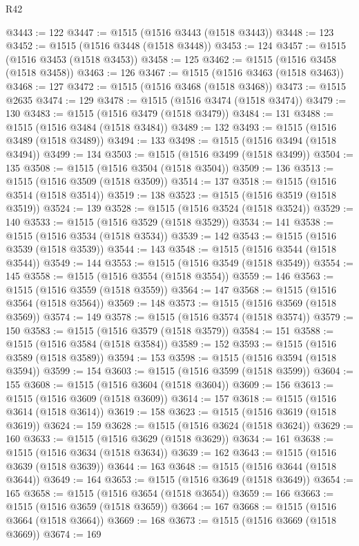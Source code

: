 \begin{lexlean}{R42}
\begin{coremodule}
{@3443 := 122
@3447 := @1515 (@1516 @3443 (@1518 @3443))
@3448 := 123
@3452 := @1515 (@1516 @3448 (@1518 @3448))
@3453 := 124
@3457 := @1515 (@1516 @3453 (@1518 @3453))
@3458 := 125
@3462 := @1515 (@1516 @3458 (@1518 @3458))
@3463 := 126
@3467 := @1515 (@1516 @3463 (@1518 @3463))
@3468 := 127
@3472 := @1515 (@1516 @3468 (@1518 @3468))
@3473 := @1515 @2635
@3474 := 129
@3478 := @1515 (@1516 @3474 (@1518 @3474))
@3479 := 130
@3483 := @1515 (@1516 @3479 (@1518 @3479))
@3484 := 131
@3488 := @1515 (@1516 @3484 (@1518 @3484))
@3489 := 132
@3493 := @1515 (@1516 @3489 (@1518 @3489))
@3494 := 133
@3498 := @1515 (@1516 @3494 (@1518 @3494))
@3499 := 134
@3503 := @1515 (@1516 @3499 (@1518 @3499))
@3504 := 135
@3508 := @1515 (@1516 @3504 (@1518 @3504))
@3509 := 136
@3513 := @1515 (@1516 @3509 (@1518 @3509))
@3514 := 137
@3518 := @1515 (@1516 @3514 (@1518 @3514))
@3519 := 138
@3523 := @1515 (@1516 @3519 (@1518 @3519))
@3524 := 139
@3528 := @1515 (@1516 @3524 (@1518 @3524))
@3529 := 140
@3533 := @1515 (@1516 @3529 (@1518 @3529))
@3534 := 141
@3538 := @1515 (@1516 @3534 (@1518 @3534))
@3539 := 142
@3543 := @1515 (@1516 @3539 (@1518 @3539))
@3544 := 143
@3548 := @1515 (@1516 @3544 (@1518 @3544))
@3549 := 144
@3553 := @1515 (@1516 @3549 (@1518 @3549))
@3554 := 145
@3558 := @1515 (@1516 @3554 (@1518 @3554))
@3559 := 146
@3563 := @1515 (@1516 @3559 (@1518 @3559))
@3564 := 147
@3568 := @1515 (@1516 @3564 (@1518 @3564))
@3569 := 148
@3573 := @1515 (@1516 @3569 (@1518 @3569))
@3574 := 149
@3578 := @1515 (@1516 @3574 (@1518 @3574))
@3579 := 150
@3583 := @1515 (@1516 @3579 (@1518 @3579))
@3584 := 151
@3588 := @1515 (@1516 @3584 (@1518 @3584))
@3589 := 152
@3593 := @1515 (@1516 @3589 (@1518 @3589))
@3594 := 153
@3598 := @1515 (@1516 @3594 (@1518 @3594))
@3599 := 154
@3603 := @1515 (@1516 @3599 (@1518 @3599))
@3604 := 155
@3608 := @1515 (@1516 @3604 (@1518 @3604))
@3609 := 156
@3613 := @1515 (@1516 @3609 (@1518 @3609))
@3614 := 157
@3618 := @1515 (@1516 @3614 (@1518 @3614))
@3619 := 158
@3623 := @1515 (@1516 @3619 (@1518 @3619))
@3624 := 159
@3628 := @1515 (@1516 @3624 (@1518 @3624))
@3629 := 160
@3633 := @1515 (@1516 @3629 (@1518 @3629))
@3634 := 161
@3638 := @1515 (@1516 @3634 (@1518 @3634))
@3639 := 162
@3643 := @1515 (@1516 @3639 (@1518 @3639))
@3644 := 163
@3648 := @1515 (@1516 @3644 (@1518 @3644))
@3649 := 164
@3653 := @1515 (@1516 @3649 (@1518 @3649))
@3654 := 165
@3658 := @1515 (@1516 @3654 (@1518 @3654))
@3659 := 166
@3663 := @1515 (@1516 @3659 (@1518 @3659))
@3664 := 167
@3668 := @1515 (@1516 @3664 (@1518 @3664))
@3669 := 168
@3673 := @1515 (@1516 @3669 (@1518 @3669))
@3674 := 169
}
\end{coremodule}
\end{lexlean}
